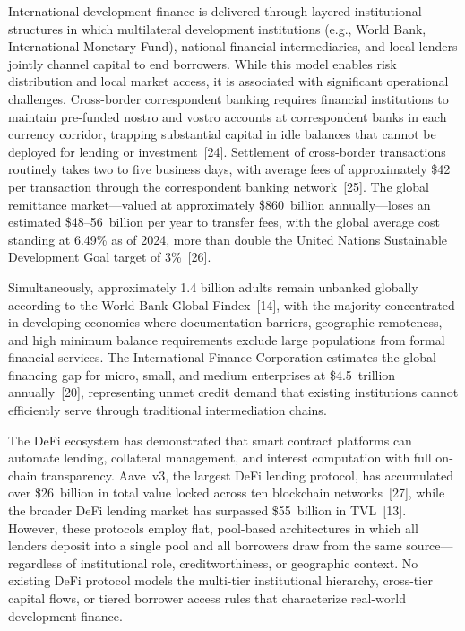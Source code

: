 \documentclass[12pt,a4paper]{report}
\begin{document}
International development finance is delivered through layered institutional structures in which multilateral development institutions (e.g., World Bank, International Monetary Fund), national financial intermediaries, and local lenders jointly channel capital to end borrowers. While this model enables risk distribution and local market access, it is associated with significant operational challenges. Cross-border correspondent banking requires financial institutions to maintain pre-funded nostro and vostro accounts at correspondent banks in each currency corridor, trapping substantial capital in idle balances that cannot be deployed for lending or investment~[24]. Settlement of cross-border transactions routinely takes two to five business days, with average fees of approximately \$42 per transaction through the correspondent banking network~[25]. The global remittance market---valued at approximately \$860~billion annually---loses an estimated \$48--56~billion per year to transfer fees, with the global average cost standing at 6.49\% as of 2024, more than double the United Nations Sustainable Development Goal target of 3\%~[26].

Simultaneously, approximately 1.4 billion adults remain unbanked globally according to the World Bank Global Findex~[14], with the majority concentrated in developing economies where documentation barriers, geographic remoteness, and high minimum balance requirements exclude large populations from formal financial services. The International Finance Corporation estimates the global financing gap for micro, small, and medium enterprises at \$4.5~trillion annually~[20], representing unmet credit demand that existing institutions cannot efficiently serve through traditional intermediation chains.

The DeFi ecosystem has demonstrated that smart contract platforms can automate lending, collateral management, and interest computation with full on-chain transparency. Aave~v3, the largest DeFi lending protocol, has accumulated over \$26~billion in total value locked across ten blockchain networks~[27], while the broader DeFi lending market has surpassed \$55~billion in TVL~[13]. However, these protocols employ flat, pool-based architectures in which all lenders deposit into a single pool and all borrowers draw from the same source---regardless of institutional role, creditworthiness, or geographic context. No existing DeFi protocol models the multi-tier institutional hierarchy, cross-tier capital flows, or tiered borrower access rules that characterize real-world development finance.
\end{document}
